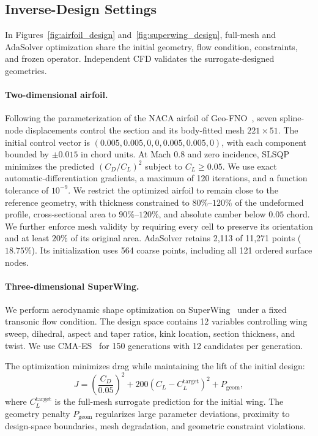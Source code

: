 \subsection{Inverse-Design Settings}
\label{app:inverse_design_settings}

In Figures~\ref{fig:airfoil_design} and~\ref{fig:superwing_design}, full-mesh and AdaSolver optimization share the initial geometry, flow condition, constraints, and frozen operator. Independent CFD validates the surrogate-designed geometries.

\paragraph{Two-dimensional airfoil.}
Following the parameterization of the NACA airfoil of Geo-FNO~\citep{li2023geofno}, seven spline-node displacements control the section and its body-fitted mesh $221\times51$. The initial control vector is $(0.005,0.005,0,0,0.005,0.005,0)$, with each component bounded by $\pm0.015$ in chord units. At Mach $0.8$ and zero incidence, SLSQP minimizes the predicted $(C_D/C_L)^2$ subject to $C_L\geq0.05$. We use exact automatic-differentiation gradients, a maximum of 120 iterations, and a function tolerance of $10^{-9}$. We restrict the optimized airfoil to remain close to the reference geometry, with thickness constrained to \(80\%\)–\(120\%\) of the undeformed profile, cross-sectional area to \(90\%\)–\(120\%\), and absolute camber below \(0.05\) chord. We further enforce mesh validity by requiring every cell to preserve its orientation and at least \(20\%\) of its original area. AdaSolver retains 2,113 of 11,271 points ($18.75\%$). Its initialization uses 564 coarse points, including all 121 ordered surface nodes. 

\paragraph{Three-dimensional SuperWing.}
We perform aerodynamic shape optimization on SuperWing~\citep{yang2025superwing}
under a fixed transonic flow condition. The design space contains 12 variables
controlling wing sweep, dihedral, aspect and taper ratios, kink location,
section thickness, and twist. We use CMA-ES~\citep{hansen2001completely} for
150 generations with 12 candidates per generation.

The optimization minimizes drag while maintaining the lift of the initial design:
\begin{equation}
    J=\left(\frac{C_D}{0.05}\right)^2
      +200\left(C_L-C_L^{\mathrm{target}}\right)^2
      +P_{\mathrm{geom}},
    \label{eq:app_wing_design_objective}
\end{equation}
where $C_L^{\mathrm{target}}$ is the full-mesh surrogate prediction for the
initial wing. The geometry penalty $P_{\mathrm{geom}}$ regularizes large
parameter deviations, proximity to design-space boundaries, mesh degradation,
and geometric constraint violations.

